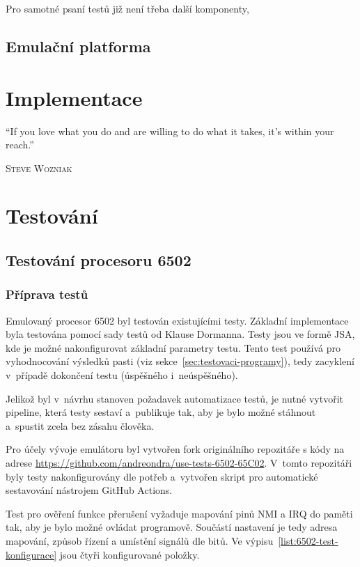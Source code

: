 Pro samotné psaní testů již není třeba další komponenty, 

\section{Emulační platforma}

\chapter{Implementace}
\epigraph{
	\enquote{If you love what you do and are willing to do what it takes, it's within your reach.}
}{\textsc{Steve Wozniak}}

\chapter{Testování}

\section{Testování procesoru 6502}
\subsection{Příprava testů}
Emulovaný procesor 6502 byl testován existujícími testy. Základní implementace byla testována pomocí sady testů od Klause Dormanna. Testy jsou ve formě JSA, kde je možné nakonfigurovat základní parametry testu. Tento test používá pro vyhodnocování výsledků pasti (viz sekce~\ref{sec:testovaci-programy}), tedy zacyklení v~případě dokončení testu (úspěšného i~neúspěšného).

Jelikož byl v~návrhu stanoven požadavek automatizace testů, je nutné vytvořit pipeline, která testy sestaví a~publikuje tak, aby je bylo možné stáhnout a~spustit zcela bez zásahu člověka.

Pro účely vývoje emulátoru byl vytvořen fork originálního repozitáře s kódy na adrese \url{https://github.com/andreondra/use-tests-6502-65C02}. V~tomto repozitáři byly testy nakonfigurovány dle potřeb a~vytvořen skript pro automatické sestavování nástrojem GitHub Actions.

Test pro ověření funkce přerušení vyžaduje mapování pinů NMI a IRQ do paměti tak, aby je bylo možné ovládat programově. Součástí nastavení je tedy adresa mapování, způsob řízení a umístění signálů dle bitů. Ve výpisu~\ref{list:6502-test-konfigurace} jsou čtyři konfigurované položky.

